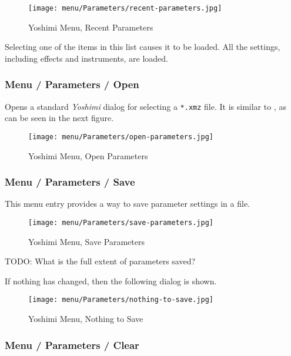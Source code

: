 \begin{figure}[H]
   \centering 
   \texttt{[image: menu/Parameters/recent-parameters.jpg]}
   \caption{Yoshimi Menu, Recent Parameters}
   \label{fig:yoshimi_menu_recent_parameters}
\end{figure}

   Selecting one of the items in this list causes it to be loaded.
   All the settings, including effects and instruments, are loaded.

\subsubsection{Menu / Parameters / Open}
\label{subsubsec:menu_parameters_open}

   Opens a standard \textsl{Yoshimi} dialog for selecting a
   \texttt{*.xmz} file.
   It is similar to
   ,
   as can be seen in the next figure.

\begin{figure}[H]
   \centering 
   \texttt{[image: menu/Parameters/open-parameters.jpg]}
   \caption{Yoshimi Menu, Open Parameters}
   \label{fig:yoshimi_menu_open_parameters}
\end{figure}

\subsubsection{Menu / Parameters / Save}
\label{subsubsec:menu_parameters_save}

   This menu entry provides a way to save parameter settings in
   a file.

\begin{figure}[H]
   \centering 
   \texttt{[image: menu/Parameters/save-parameters.jpg]}
   \caption{Yoshimi Menu, Save Parameters}
   \label{fig:yoshimi_menu_save_parameters}
\end{figure}

   TODO:  What is the full extent of parameters saved?

   If nothing has changed, then the following dialog is shown.

\begin{figure}[H]
   \centering 
   \texttt{[image: menu/Parameters/nothing-to-save.jpg]}
   \caption{Yoshimi Menu, Nothing to Save}
   \label{fig:yoshimi_menu_nothing_to_save_parameters}
\end{figure}

\subsubsection{Menu / Parameters / Clear}
\label{subsubsec:menu_parameters_clear}

